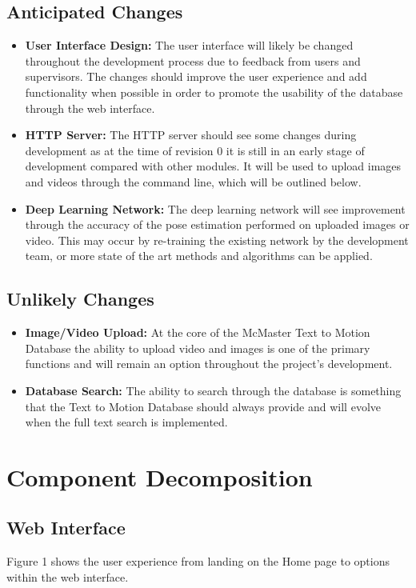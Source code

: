 \documentclass{scrreprt}
\begin{document}
\section{Anticipated Changes}
  \begin{itemize}
    \item \textbf {User Interface Design:} The user interface will likely be changed throughout the development process due to feedback from users and supervisors. The changes should improve the user experience and add functionality when possible in order to promote the usability of the database through the web interface.
    \item \textbf {HTTP Server:} The HTTP server should see some changes during development as at the time of revision 0 it is still in an early stage of development compared with other modules. It will be used to upload images and videos through the command line, which will be outlined below.
    \item \textbf{Deep Learning Network:} The deep learning network will see improvement through the accuracy of the pose estimation performed on uploaded images or video. This may occur by re-training the existing network by the development team, or more state of the art methods and algorithms can be applied.
  \end{itemize}

\section{Unlikely Changes}
  \begin{itemize}
    \item \textbf {Image/Video Upload:} At the core of the McMaster Text to Motion Database the ability to upload video and images is one of the primary functions and will remain an option throughout the project's development.
    \item \textbf {Database Search:} The ability to search through the database is something that the Text to Motion Database should always provide and will evolve when the full text search is implemented.
  \end{itemize}

\chapter{Component Decomposition}

\section{Web Interface}
Figure 1 shows the user experience from landing on the Home page to options within the web interface.
\end{document}
